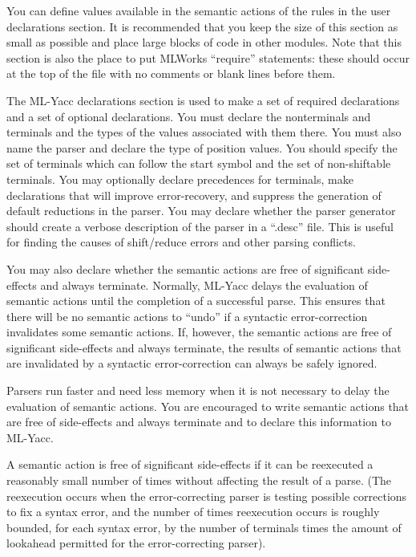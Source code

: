 \documentclass{article}
\begin{document}
You can define values available in the semantic actions of the rules
in the user declarations section.  It is recommended that you keep the
size of this section as small as possible and place large blocks of
code in other modules.  Note that this section is also the place to
put MLWorks ``require'' statements: these should occur at the top of the
file with no comments or blank lines before them.

The ML-Yacc declarations section is used to make a set
of required declarations and a set of optional declarations.
You must declare the nonterminals and terminals and the
types of the values associated with them there.  You must
also name the parser and declare the type of position values.
You should specify the set of terminals which can follow
the start symbol and the set of non-shiftable terminals.
You may optionally declare precedences for terminals,
make declarations that will
improve error-recovery, and suppress the generation of
default reductions in the parser.  You may 
declare whether the parser generator should create
a verbose description of the parser in a ``.desc'' file.  This is useful
for finding the causes of shift/reduce errors and other parsing conflicts.

You may also declare whether the semantic actions are
free of significant side-effects and always terminate.  Normally, ML-Yacc
delays the evaluation of semantic actions until the completion of a
successful parse.  This ensures that there will be no semantic actions
to ``undo'' if a syntactic error-correction invalidates some semantic
actions.  If, however, the semantic actions are free of significant
side-effects and always terminate, the results of semantic actions that
are invalidated by a syntactic error-correction can always be safely
ignored.

Parsers run faster and need less memory when it is not
necessary to delay the evaluation of semantic actions.  You are
encouraged to write semantic actions that are free of side-effects and
always terminate and to declare this information to ML-Yacc.

A semantic action is free of significant side-effects if it can be reexecuted
a reasonably small number of times without affecting the result of a
parse.  (The reexecution occurs when the error-correcting parser is testing
possible corrections to fix a syntax error, and the number of times
reexecution occurs is roughly bounded, for each syntax error, by the number of
terminals times the amount of lookahead permitted for the error-correcting
parser).
\end{document}
